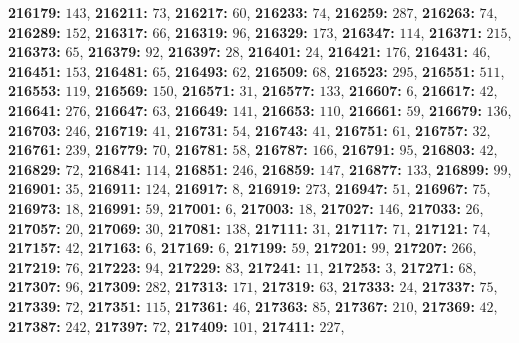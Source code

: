 \textsf{\bfseries 216179:} $143$, \textsf{\bfseries 216211:} $73$, \textsf{\bfseries 216217:} $60$, \textsf{\bfseries 216233:} $74$, \textsf{\bfseries 216259:} $287$, \textsf{\bfseries 216263:} $74$, \textsf{\bfseries 216289:} $152$, \textsf{\bfseries 216317:} $66$, \textsf{\bfseries 216319:} $96$, \textsf{\bfseries 216329:} $173$, \textsf{\bfseries 216347:} $114$, \textsf{\bfseries 216371:} $215$, \textsf{\bfseries 216373:} $65$, \textsf{\bfseries 216379:} $92$, \textsf{\bfseries 216397:} $28$, \textsf{\bfseries 216401:} $24$, \textsf{\bfseries 216421:} $176$, \textsf{\bfseries 216431:} $46$, \textsf{\bfseries 216451:} $153$, \textsf{\bfseries 216481:} $65$, \textsf{\bfseries 216493:} $62$, \textsf{\bfseries 216509:} $68$, \textsf{\bfseries 216523:} $295$, \textsf{\bfseries 216551:} $511$, \textsf{\bfseries 216553:} $119$, \textsf{\bfseries 216569:} $150$, \textsf{\bfseries 216571:} $31$, \textsf{\bfseries 216577:} $133$, \textsf{\bfseries 216607:} $6$, \textsf{\bfseries 216617:} $42$, \textsf{\bfseries 216641:} $276$, \textsf{\bfseries 216647:} $63$, \textsf{\bfseries 216649:} $141$, \textsf{\bfseries 216653:} $110$, \textsf{\bfseries 216661:} $59$, \textsf{\bfseries 216679:} $136$, \textsf{\bfseries 216703:} $246$, \textsf{\bfseries 216719:} $41$, \textsf{\bfseries 216731:} $54$, \textsf{\bfseries 216743:} $41$, \textsf{\bfseries 216751:} $61$, \textsf{\bfseries 216757:} $32$, \textsf{\bfseries 216761:} $239$, \textsf{\bfseries 216779:} $70$, \textsf{\bfseries 216781:} $58$, \textsf{\bfseries 216787:} $166$, \textsf{\bfseries 216791:} $95$, \textsf{\bfseries 216803:} $42$, \textsf{\bfseries 216829:} $72$, \textsf{\bfseries 216841:} $114$, \textsf{\bfseries 216851:} $246$, \textsf{\bfseries 216859:} $147$, \textsf{\bfseries 216877:} $133$, \textsf{\bfseries 216899:} $99$, \textsf{\bfseries 216901:} $35$, \textsf{\bfseries 216911:} $124$, \textsf{\bfseries 216917:} $8$, \textsf{\bfseries 216919:} $273$, \textsf{\bfseries 216947:} $51$, \textsf{\bfseries 216967:} $75$, \textsf{\bfseries 216973:} $18$, \textsf{\bfseries 216991:} $59$, \textsf{\bfseries 217001:} $6$, \textsf{\bfseries 217003:} $18$, \textsf{\bfseries 217027:} $146$, \textsf{\bfseries 217033:} $26$, \textsf{\bfseries 217057:} $20$, \textsf{\bfseries 217069:} $30$, \textsf{\bfseries 217081:} $138$, \textsf{\bfseries 217111:} $31$, \textsf{\bfseries 217117:} $71$, \textsf{\bfseries 217121:} $74$, \textsf{\bfseries 217157:} $42$, \textsf{\bfseries 217163:} $6$, \textsf{\bfseries 217169:} $6$, \textsf{\bfseries 217199:} $59$, \textsf{\bfseries 217201:} $99$, \textsf{\bfseries 217207:} $266$, \textsf{\bfseries 217219:} $76$, \textsf{\bfseries 217223:} $94$, \textsf{\bfseries 217229:} $83$, \textsf{\bfseries 217241:} $11$, \textsf{\bfseries 217253:} $3$, \textsf{\bfseries 217271:} $68$, \textsf{\bfseries 217307:} $96$, \textsf{\bfseries 217309:} $282$, \textsf{\bfseries 217313:} $171$, \textsf{\bfseries 217319:} $63$, \textsf{\bfseries 217333:} $24$, \textsf{\bfseries 217337:} $75$, \textsf{\bfseries 217339:} $72$, \textsf{\bfseries 217351:} $115$, \textsf{\bfseries 217361:} $46$, \textsf{\bfseries 217363:} $85$, \textsf{\bfseries 217367:} $210$, \textsf{\bfseries 217369:} $42$, \textsf{\bfseries 217387:} $242$, \textsf{\bfseries 217397:} $72$, \textsf{\bfseries 217409:} $101$, \textsf{\bfseries 217411:} $227$, 
